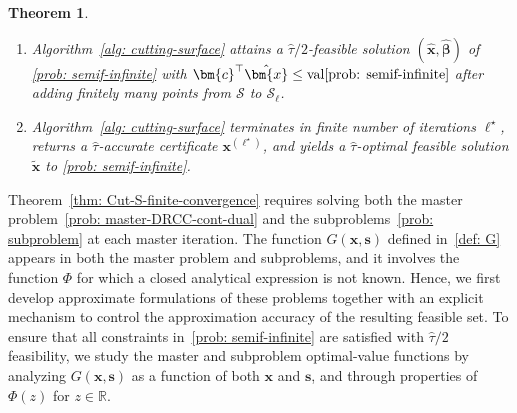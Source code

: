 \documentclass[opre,sglanonrev]{informs4}
\newtheorem{theorem}{Theorem}
\newcommand{\mF}{\mathcal{F}}
\newcommand{\mS}{\mathcal{S}}
\newcommand{\mbR}{\mathbb R}
\newcommand{\hbbeta}{\hat{\bbeta}}
\newcommand{\bbeta}{\bm{\beta}}
\newcommand{\bc}{\bm{c}}
\newcommand{\bs}{\bm{s}}
\newcommand{\bx}{\bm{x}}
\begin{document}
{\begin{theorem}
\begin{enumerate}[leftmargin=0.975em]
    \item[i)] Algorithm~\ref{alg: cutting-surface} attains a \( \hat{\tau}/2 \)-feasible solution \( (\hat{\bx}, \hbbeta) \) of \eqref{prob: semif-infinite} with \( \bc^\top \hat{\bx} \leq \text{val\eqref{prob: semif-infinite}} \) after adding finitely many points from $\mS$ to $\mS_\ell$.

\item[ii)] Algorithm~\ref{alg: cutting-surface} terminates in finite number of iterations \(\ell^\star\), returns a
\(\hat{\tau}\)-accurate certificate \(\bx^{(\ell^\star)}\), and yields a
\(\hat{\tau}\)-optimal feasible solution \(\widetilde{\bx}\) to
\eqref{prob: semif-infinite}.
\end{enumerate} 
\end{theorem}

Theorem~\ref{thm: Cut-S-finite-convergence} requires solving both the master problem~\eqref{prob: master-DRCC-cont-dual} and the subproblems~\eqref{prob: subproblem} at each master iteration. The function $G(\bx, \bs)$ defined in~\eqref{def: G} appears in both the master problem and subproblems, and it involves the function $\Phi$ for which a closed analytical expression is not known. Hence, we first develop approximate formulations of these problems together with an explicit mechanism to control the approximation accuracy of the resulting feasible set. To ensure that all constraints in~\eqref{prob: semif-infinite} are satisfied with $\hat{\tau}/2$ feasibility, we study the master and subproblem optimal-value functions by analyzing $G(\bx, \bs)$  as a function of both $\bx$ and $\bs$, and through properties of $\Phi(z)$ for $ z \in \mbR$.


}
\end{document}
